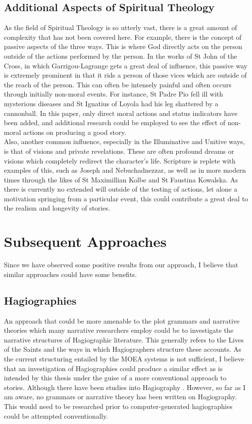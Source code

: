 \documentclass[12pt]{article}
\begin{document}
\subsection{Additional Aspects of Spiritual Theology}
As the field of Spiritual Theology is so utterly vast, there is a great amount of complexity that has not been covered here. For example, there is the concept of passive aspects of the three ways. This is where God directly acts on the person outside of the actions performed by the person. In the works of St John of the Cross, in which Garrigou-Lagrange gets a great deal of influence, this passive way is extremely prominent in that it rids a person of those vices which are outside of the reach of the person. This can often be intensely painful and often occurs through initially non-moral events. For instance, St Padre Pio fell ill with mysterious diseases \cite{allegri2000padre} and St Ignatius of Loyola had his leg shattered by a cannonball\cite{loyola2009autobiography}. In this paper, only direct moral actions and status indicators have been added, and additional research could be employed to see the effect of non-moral actions on producing a good story. \\

Also, another common influence, especially in the Illuminative and Unitive ways, is that of visions and private revelations. These are often profound dreams or visions which completely redirect the character's life. Scripture is replete with examples of this, such as Joseph and Nebuchadnezzar, as well as in more modern times through the likes of St Maximillian Kolbe and St Faustina Kowalska. As there is currently no extended will outside of the testing of actions, let alone a motivation springing from a particular event, this could contribute a great deal to the realism and longevity of stories.  \\

\section{Subsequent Approaches}
Since we have observed some positive results from our approach, I believe that similar approaches could have some benefits.

\subsection{Hagiographies} 
An approach that could be more amenable to the plot grammars and narrative theories which many narrative researchers employ could be to investigate the narrative structures of Hagiographic literature. This generally refers to the Lives of the Saints and the ways in which Hagiographers structure these accounts. As the current structuring entailed by the MOEA systems is not sufficient, I believe that an investigation of Hagiographies could produce a similar effect as is intended by this thesis under the guise of a more conventional approach to stories. Although there have been studies into Hagiography \cite{Haseldine1994} \cite{Krueger2004}. However, so far as I am aware, no grammars or narrative theory has been written on Hagiography. This would need to be researched prior to computer-generated hagiographies could be attempted conventionally.  
\end{document}
